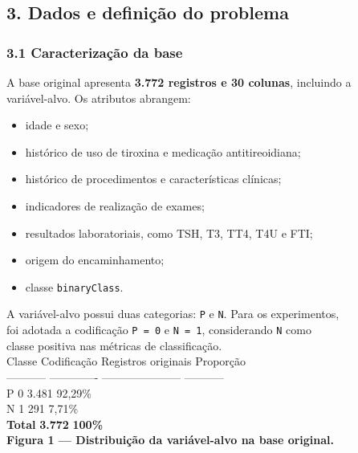 \documentclass{article}
\begin{document}
\subsection{3. Dados e definição do problema}

\subsubsection{3.1 Caracterização da base}

A base original apresenta \textbf{3.772 registros e 30 colunas}, incluindo a \\
variável-alvo. Os atributos abrangem: \\

\begin{itemize}
  \item   idade e sexo;
  \item   histórico de uso de tiroxina e medicação antitireoidiana;
  \item   histórico de procedimentos e características clínicas;
  \item   indicadores de realização de exames;
  \item   resultados laboratoriais, como TSH, T3, TT4, T4U e FTI;
  \item   origem do encaminhamento;
  \item   classe \texttt{binaryClass}.
\end{itemize}

A variável-alvo possui duas categorias: \texttt{P} e \texttt{N}. Para os experimentos, \\
foi adotada a codificação \texttt{P = 0} e \texttt{N = 1}, considerando \texttt{N} como \\
classe positiva nas métricas de classificação. \\

Classe        Codificação   Registros originais   Proporção \\
----------- ------------- --------------------- ----------- \\
P                       0                 3.481      92,29\% \\
N                       1                   291       7,71\% \\
\textbf{Total}                             \textbf{3.772}    \textbf{100\%} \\

\textbf{Figura 1 --- Distribuição da variável-alvo na base original.} \\
\end{document}

